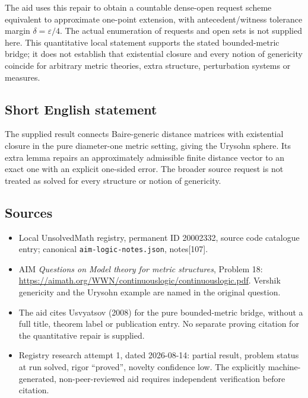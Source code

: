 \documentclass[11pt]{article}
\newcommand{\eps}{\varepsilon}
\begin{document}
The aid uses this repair to obtain a countable dense-open request scheme equivalent to approximate one-point extension, with antecedent/witness tolerance margin $\delta=\eps/4$. The actual enumeration of requests and open sets is not supplied here. This quantitative local statement supports the stated bounded-metric bridge; it does not establish that existential closure and every notion of genericity coincide for arbitrary metric theories, extra structure, perturbation systems or measures.
\subsection{Short English statement}
The supplied result connects Baire-generic distance matrices with existential closure in the pure diameter-one metric setting, giving the Urysohn sphere. Its extra lemma repairs an approximately admissible finite distance vector to an exact one with an explicit one-sided error. The broader source request is not treated as solved for every structure or notion of genericity.
\subsection{Sources}
\begin{itemize}
\item Local UnsolvedMath registry, permanent ID 20002332, source code catalogue entry; canonical \texttt{aim-logic-notes.json}, notes[107].
\item AIM \emph{Questions on Model theory for metric structures}, Problem 18: \url{https://aimath.org/WWN/continuouslogic/continuouslogic.pdf}. Vershik genericity and the Urysohn example are named in the original question.
\item The aid cites Usvyatsov (2008) for the pure bounded-metric bridge, without a full title, theorem label or publication entry. No separate proving citation for the quantitative repair is supplied.
\item Registry research attempt 1, dated 2026-08-14: partial result, problem status at run solved, rigor ``proved'', novelty confidence low. The explicitly machine-generated, non-peer-reviewed aid requires independent verification before citation.
\end{itemize}
\end{document}
